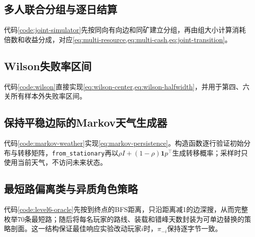 

\subsection{多人联合分组与逐日结算}

代码\ref{code:joint-simulator}先按同向有向边和同矿建立分组，再由组大小计算消耗倍数和收益分成，对应\cref{eq:multi-resource,eq:multi-cash,eq:joint-transition}。



\subsection{Wilson失败率区间}

代码\ref{code:wilson}直接实现\cref{eq:wilson-center,eq:wilson-halfwidth}，并用于第四、六关所有样本外失败率区间。



\subsection{保持平稳边际的Markov天气生成器}

代码\ref{code:markov-weather}实现\cref{eq:markov-persistence}。构造函数逐行验证初始分布与转移矩阵，\texttt{from\_stationary}再以$\rho I+(1-\rho)\bm 1p^\top$生成转移概率；采样时只使用当前天气，不访问未来状态。



\subsection{最短路偏离类与异质角色策略}

代码\ref{code:level6-oracle}先按到终点的BFS距离，只沿距离减1的边深搜，从而完整枚举70条最短路；随后将每名玩家的路线、装载和错峰天数封装为可单边替换的策略剖面。这一结构保证最佳响应实验改动玩家$i$时，$\pi_{-i}$保持逐字节一致。




